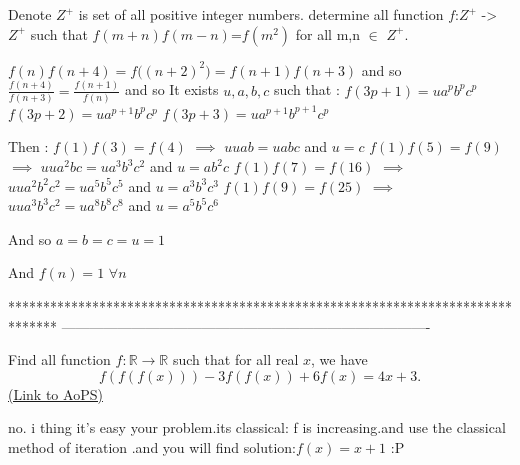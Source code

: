 \begin{mysolution}
	\begin{tcolorbox}Denote $ Z^{+}$ is set of all positive integer numbers. 
   determine all function $ f$:$ Z^{+}$ ->$ Z^{+}$ such that
                            $ f(m+n)f(m-n)$=$ f(m^{2})$ for all m,n $ \in$ $ Z^{+}$.\end{tcolorbox}

${ f(n)f(n+4)=f((n+2)^{2}})=f(n+1)f(n+3)$ and so $ \frac{f(n+4)}{f(n+3)}=\frac{f(n+1)}{f(n)}$ and so It exists $ u,a,b,c$ such that :
$ f(3p+1)=ua^{p}b^{p}c^{p}$
$ f(3p+2)=ua^{p+1}b^{p}c^{p}$
$ f(3p+3)=ua^{p+1}b^{p+1}c^{p}$

Then :
$ f(1)f(3)=f(4)$ $ \implies$ $ u uab=uabc$ and $ u=c$
$ f(1)f(5)=f(9)$ $ \implies$ $ u ua^{2}bc = ua^{3}b^{3}c^{2}$ and $ u=ab^{2}c$
$ f(1)f(7)=f(16)$ $ \implies$ $ u ua^{2}b^{2}c^{2}= ua^{5}b^{5}c^{5}$ and $ u=a^{3}b^{3}c^{3}$
$ f(1)f(9)=f(25)$ $ \implies$ $ u ua^{3}b^{3}c^{2}= ua^{8}b^{8}c^{8}$ and $ u=a^{5}b^{5}c^{6}$

And so $ a=b=c=u=1$

And $ f(n)=1$ $ \forall n$
\end{mysolution}
*******************************************************************************
-------------------------------------------------------------------------------

\begin{problem}
	Find all function $f: \mathbb R \to \mathbb R$ such that for all real $x$, we have
\[f(f(f(x)))-3f(f(x))+6f(x)= 4x+3.\]
	\flushright \href{https://artofproblemsolving.com/community/c6h166839}{(Link to AoPS)}
\end{problem}



\begin{mysolution}
	no. i thing it's easy your problem.its classical:
f is increasing.and use the classical method of iteration .and you will find solution:$ f(x) = x+1$  :P
\end{mysolution}



